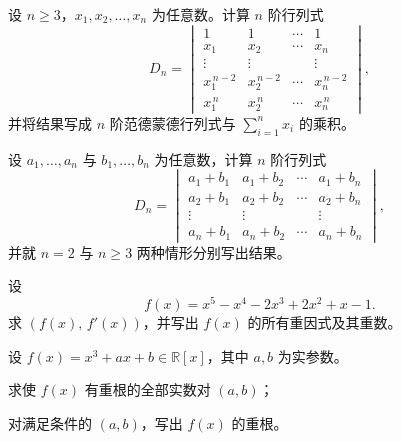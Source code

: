 \documentclass[11pt,a4paper,fontset=windows]{ctexart}
\begin{document}
\begin{qs}
\item 设 $n\ge 3$，$x_1,x_2,\ldots,x_n$ 为任意数。计算 $n$ 阶行列式
\[
D_n=\begin{vmatrix}
1&1&\cdots&1\\
x_1&x_2&\cdots&x_n\\
\vdots&\vdots&&\vdots\\
x_1^{\,n-2}&x_2^{\,n-2}&\cdots&x_n^{\,n-2}\\
x_1^{\,n}&x_2^{\,n}&\cdots&x_n^{\,n}
\end{vmatrix},
\]
并将结果写成 $n$ 阶范德蒙德行列式与 $\displaystyle\sum_{i=1}^{n}x_i$ 的乘积。

\item 设 $a_1,\ldots,a_n$ 与 $b_1,\ldots,b_n$ 为任意数，计算 $n$ 阶行列式
\[
D_n=\begin{vmatrix}
a_1+b_1&a_1+b_2&\cdots&a_1+b_n\\
a_2+b_1&a_2+b_2&\cdots&a_2+b_n\\
\vdots&\vdots&&\vdots\\
a_n+b_1&a_n+b_2&\cdots&a_n+b_n
\end{vmatrix},
\]
并就 $n=2$ 与 $n\ge 3$ 两种情形分别写出结果。

\item 设
\[
f(x)=x^{5}-x^{4}-2x^{3}+2x^{2}+x-1 .
\]
求 $(f(x),\,f'(x))$，并写出 $f(x)$ 的所有重因式及其重数。

\item 设 $f(x)=x^{3}+ax+b\in\mathbb{R}[x]$，其中 $a,b$ 为实参数。
\begin{sub}
\item 求使 $f(x)$ 有重根的全部实数对 $(a,b)$；
\item 对满足条件的 $(a,b)$，写出 $f(x)$ 的重根。
\end{sub}
\end{qs}
\end{document}
